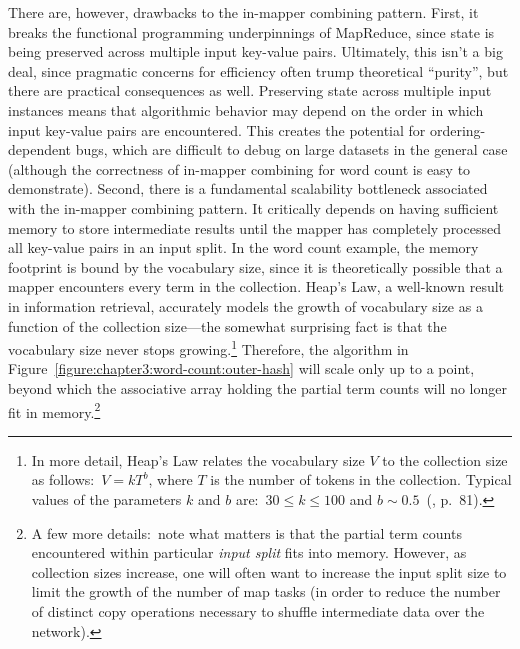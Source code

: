 There are, however, drawbacks to the in-mapper combining pattern.
First, it breaks the functional programming underpinnings of
MapReduce, since state is being preserved across multiple input
key-value pairs.  Ultimately, this isn't a big deal, since pragmatic
concerns for efficiency often trump theoretical ``purity'', but there
are practical consequences as well.  Preserving state across multiple
input instances means that algorithmic behavior may depend on the
order in which input key-value pairs are encountered.  This creates
the potential for ordering-dependent bugs, which are difficult to
debug on large datasets in the general case (although the correctness
of in-mapper combining for word count is easy to demonstrate).
Second, there is a fundamental scalability bottleneck associated with
the in-mapper combining pattern.  It critically depends on having
sufficient memory to store intermediate results until the mapper has
completely processed all key-value pairs in an input split.  In the
word count example, the memory footprint is bound by the vocabulary
size, since it is theoretically possible that a mapper encounters
every term in the collection.  Heap's Law, a well-known result in
information retrieval, accurately models the growth of vocabulary size
as a function of the collection size---the somewhat surprising fact is
that the vocabulary size never stops growing.\footnote{In more detail,
  Heap's Law relates the vocabulary size $V$ to the collection size as
  follows:\ $V =kT^b$, where $T$ is the number of tokens in the
  collection.  Typical values of the parameters $k$ and $b$ are:\ $30
  \leq k \leq 100$ and $b \sim 0.5$~(\cite{Manning_etal_2008},
  p.\ 81).}  Therefore, the algorithm in
Figure~\ref{figure:chapter3:word-count:outer-hash} will scale only up
to a point, beyond which the associative array holding the partial
term counts will no longer fit in memory.\footnote{A few more
  details:\ note what matters is that the partial term counts
  encountered within particular \emph{input split} fits into memory.
  However, as collection sizes increase, one will often want to
  increase the input split size to limit the growth of the number of
  map tasks (in order to reduce the number of distinct copy operations
  necessary to shuffle intermediate data over the network).}

